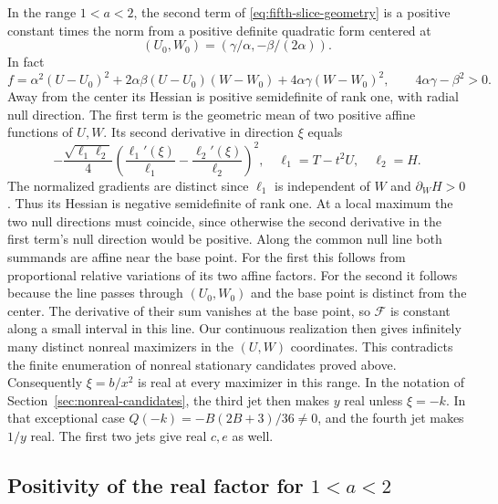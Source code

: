 \documentclass[11pt]{article}
\begin{document}
In the range \(1<a<2\), the second term of
\eqref{eq:fifth-slice-geometry} is a positive constant times
the norm from a positive definite quadratic form centered at
\[
 (U_0,W_0)=\left(\gamma/\alpha,-\beta/(2\alpha)\right).
\]
In fact
\[
 f=\alpha^2(U-U_0)^2+
      2\alpha\beta(U-U_0)(W-W_0)+4\alpha\gamma(W-W_0)^2,
 \qquad 4\alpha\gamma-\beta^2>0.
\]
Away from the center its Hessian is positive semidefinite of
rank one, with radial null direction. The first term is the
geometric mean of two positive affine functions of \(U,W\).
Its second derivative in direction \(\xi\) equals
\[
 -\frac{\sqrt{\ell_1\ell_2}}4
  \left(\frac{\ell_1'(\xi)}{\ell_1}
                  -\frac{\ell_2'(\xi)}{\ell_2}\right)^2,
 \quad \ell_1=T-t^2U,\quad \ell_2=H .
\]
The normalized gradients are distinct since
\(\ell_1\) is independent of \(W\) and \(\partial_W H>0\).
Thus its Hessian is negative semidefinite of rank one.
At a local maximum the two null directions must coincide, since
otherwise the second derivative in the first term's null
direction would be positive. Along the common null line both
summands are affine near the base point. For the first this
follows from proportional relative variations of its two
affine factors. For the second it follows because the line
passes through \((U_0,W_0)\) and the base point is distinct from
the center. The derivative of their sum vanishes at the base
point, so \(\mathcal F\) is constant along a small interval in
this line. Our continuous realization then gives infinitely
many distinct nonreal maximizers in the \((U,W)\) coordinates.
This contradicts the finite enumeration of nonreal stationary
candidates proved above. Consequently \(\xi=b/x^2\) is real at every maximizer in this
range. In the notation of Section~\ref{sec:nonreal-candidates},
the third jet then makes \(y\) real unless \(\xi=-k\).
In that exceptional case \(Q(-k)=-B(2B+3)/36\ne0\), and the
fourth jet makes \(1/y\) real. The first two jets give real
\(c,e\) as well.


\subsection{Positivity of the real factor for \texorpdfstring{\(1<a<2\)}{1<a<2}}
\end{document}
